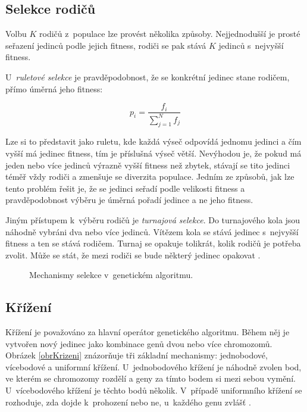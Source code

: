 \subsection{Selekce rodičů}

Volbu $K$ rodičů z~populace lze provést několika způsoby. Nejjednodušší je prosté seřazení jedinců podle jejich fitness, rodiči se pak stává $K$ jedinců s~nejvyšší fitness.

U~\emph{ruletové selekce} je pravděpodobnost, že se konkrétní jedinec stane rodičem, přímo úměrná jeho fitness:

\begin{equation*}
p_i = \frac{f_i}{\sum_{j=1}^N{f_j}}
\end{equation*}

\noindent{}Lze si to představit jako ruletu, kde každá výseč odpovídá jednomu jedinci a čím vyšší má jedinec fitness, tím je příslušná výseč větší. Nevýhodou je, že pokud má jeden nebo více jedinců výrazně vyšší fitness než zbytek, stávají se tito jedinci téměř vždy rodiči a zmenšuje se diverzita populace. Jedním ze způsobů, jak lze tento problém řešit je, že se jedinci seřadí podle velikosti fitness a pravděpodobnost výběru je úměrná pořadí jedince a ne jeho fitness.

Jiným přístupem k~výběru rodičů je \emph{turnajová selekce}. Do turnajového kola jsou náhodně vybráni dva nebo více jedinců. Vítězem kola se stává jedinec s~nejvyšší fitness a ten se stává rodičem. Turnaj se opakuje tolikrát, kolik rodičů je potřeba zvolit. Může se stát, že mezi rodiči se bude některý jedinec opakovat \cite{Modra}.


\begin{figure}[htb]
    \centering
    \caption{Mechanismy selekce v~genetickém algoritmu.}
    \label{obrSelekce}
\end{figure}



\subsection{Křížení}

Křížení je považováno za hlavní operátor genetického algoritmu. Během něj je vytvořen nový jedinec jako kombinace genů dvou nebo více chromozomů. Obrázek \ref{obrKrizeni} znázorňuje tři základní mechanismy: jednobodové, vícebodové a uniformní křížení. U~jednobodového křížení je náhodně zvolen bod, ve kterém se chromozomy rozdělí a geny za tímto bodem si mezi sebou vymění. U~vícebodového křížení je těchto bodů několik. V~případě uniformního křížení se rozhoduje, zda dojde k~prohození nebo ne, u~každého genu zvlášť \cite{Modra}.

